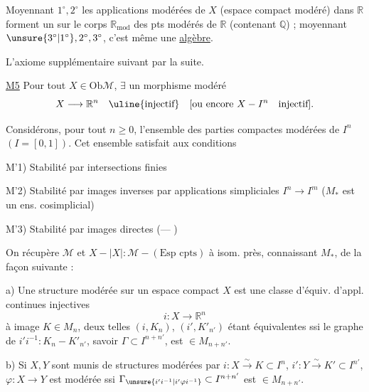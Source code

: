 Moyennant $1^\circ,2^\circ$ les applications modérées de $X$ (espace compact modéré) dans $\mathbb R$ forment un  sur le corps $\mathbb R_{\mathrm{mod}}$ des pts modérés de $\mathbb R$ (contenant $\mathbb Q$) ; moyennant $\unsure{3^\circ|1^\circ},2^\circ,3^\circ$, c'est même une \uline{algèbre}.

L'axiome supplémentaire suivant  par la suite.

\uline{M5} Pour tout $X\in\mathrm{Ob}\mathcal M$, $\exists$  un morphisme modéré
\[
X\longrightarrow\mathbb R^n\quad\uline{\text{injectif}}
\quad[\text{ou encore }X-I^n\quad\text{injectif}].
\]

Considérons, pour tout $n\geq0$, l'ensemble  des parties compactes modérées de $I^n$ $(I=[0,1])$. Cet ensemble  satisfait aux conditions


M'1) Stabilité par intersections finies

M'2) Stabilité par images inverses par applications  simpliciales $I^n\longrightarrow I^m$ ($M_*$ est un ens. cosimplicial)

M'3) Stabilité par images directes ($\text{---}$ )


On récupère $\mathcal M$ et $X-|X|:\mathcal M-(\text{Esp cpts})$ à isom. près, connaissant $M_*$, de la façon suivante :

a) Une structure modérée sur un espace compact $X$ est une classe d'équiv. d'appl. continues injectives
\[
i:X\longrightarrow\mathbb R^n
\]
à image $K\in M_n$, deux telles $(i,K_n)$, $(i',K'_{n'})$ étant équivalentes ssi le graphe de $i'i^{-1}:K_n-K'_{n'}$, savoir $\Gamma\subset I^{n+n'}$, est  $\in M_{n+n'}$.

b) Si $X,Y$ sont munis de structures modérées par $i:X\xrightarrow{\sim}K\subset I^n$, $i':Y\xrightarrow{\sim}K'\subset I^{n'}$, $\varphi:X\longrightarrow Y$ est modérée ssi $\Gamma_{\unsure{i'i^{-1}|i'\varphi i^{-1}}}\subset I^{n+n'}$ est $\in M_{n+n'}$.

